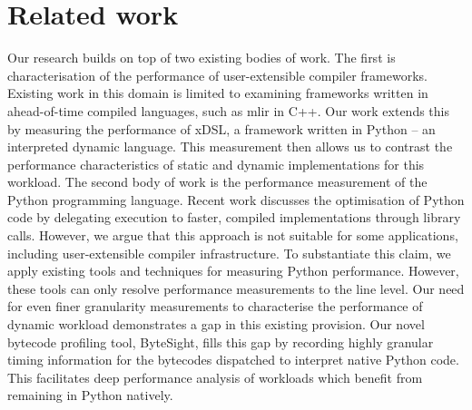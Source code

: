 \chapter{Related work}
\label{chap:related-work}

%
%

Our research builds on top of two existing bodies of work.
The first is characterisation of the performance of user-extensible compiler frameworks. Existing work in this domain is limited to examining frameworks written in ahead-of-time compiled languages, such as \ac{mlir} in C++.
Our work extends this by measuring the performance of xDSL, a framework written in Python -- an interpreted dynamic language. This measurement then allows us to contrast the performance characteristics of static and dynamic implementations for this workload.
The second body of work is the performance measurement of the Python programming language.
Recent work discusses the optimisation of Python code by delegating execution to faster, compiled implementations through library calls. However, we argue that this approach is not suitable for some applications, including user-extensible compiler infrastructure.
To substantiate this claim, we apply existing tools and techniques for measuring Python performance.
However, these tools can only resolve performance measurements to the line level. Our need for even finer granularity measurements to characterise the performance of dynamic workload demonstrates a gap in this existing provision. Our novel bytecode profiling tool, ByteSight, fills this gap by recording highly granular timing information for the bytecodes dispatched to interpret native Python code.
This facilitates deep performance analysis of workloads which benefit from remaining in Python natively.


